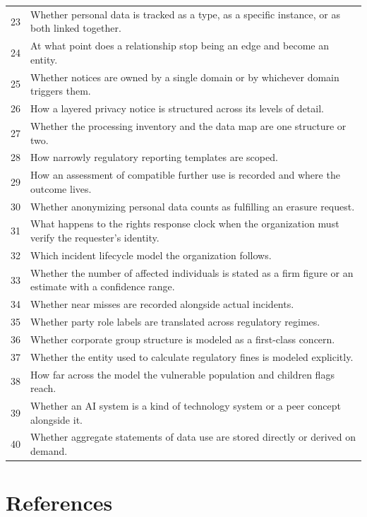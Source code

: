 \documentclass[10pt,letterpaper,twocolumn,twoside]{rho-class/rho}
\begin{document}
\begin{small}
\begin{longtable}{@{}p{} p{}@{}}
23 & Whether personal data is tracked as a type, as a specific instance, or as both linked together. \\
24 & At what point does a relationship stop being an edge and become an entity. \\
25 & Whether notices are owned by a single domain or by whichever domain triggers them. \\
26 & How a layered privacy notice is structured across its levels of detail. \\
27 & Whether the processing inventory and the data map are one structure or two. \\
28 & How narrowly regulatory reporting templates are scoped. \\
29 & How an assessment of compatible further use is recorded and where the outcome lives. \\
30 & Whether anonymizing personal data counts as fulfilling an erasure request. \\
31 & What happens to the rights response clock when the organization must verify the requester's identity. \\
32 & Which incident lifecycle model the organization follows. \\
33 & Whether the number of affected individuals is stated as a firm figure or an estimate with a confidence range. \\
34 & Whether near misses are recorded alongside actual incidents. \\
35 & Whether party role labels are translated across regulatory regimes. \\
36 & Whether corporate group structure is modeled as a first-class concern. \\
37 & Whether the entity used to calculate regulatory fines is modeled explicitly. \\
38 & How far across the model the vulnerable population and children flags reach. \\
39 & Whether an AI system is a kind of technology system or a peer concept alongside it. \\
40 & Whether aggregate statements of data use are stored directly or derived on demand. \\

\end{longtable}
\end{small}
\clearpage
\section{References}
\label{sec:z}
\togglefalse{trackcited}
\nocite{*}
\toggletrue{trackcited}
\printbibliography[category=cited, heading=none]
\end{document}
